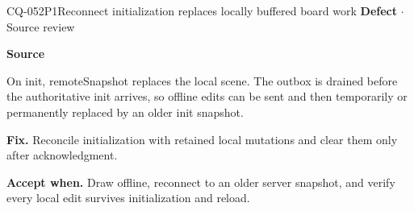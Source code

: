 \begin{finding}{CQ-052}{P1}{Reconnect initialization replaces locally buffered board work}
\textbf{Defect} $\cdot$ Source review\par
\textbf{Source}\quad{}\par
On init, remoteSnapshot replaces the local scene. The outbox is drained before the authoritative init arrives, so offline edits can be sent and then temporarily or permanently replaced by an older init snapshot.\par
\textbf{Fix.} Reconcile initialization with retained local mutations and clear them only after acknowledgment.\par
\textbf{Accept when.} Draw offline, reconnect to an older server snapshot, and verify every local edit survives initialization and reload.
\end{finding}
\clearpage
